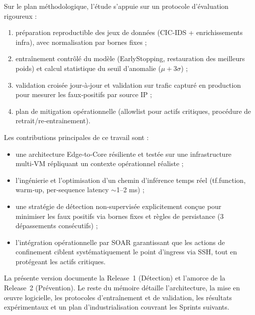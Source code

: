 Sur le plan méthodologique, l'étude s'appuie sur un protocole d'évaluation rigoureux :
\begin{enumerate}
  \item préparation reproductible des jeux de données (CIC‑IDS + enrichissements infra), avec normalisation par bornes fixes ;
  \item entraînement contrôlé du modèle (EarlyStopping, restauration des meilleurs poids) et calcul statistique du seuil d'anomalie ($\mu + 3\sigma$) ;
  \item validation croisée jour‑à‑jour et validation sur trafic capturé en production pour mesurer les faux‑positifs par source IP ;
  \item plan de mitigation opérationnelle (allowlist pour actifs critiques, procédure de retrait/re‑entrainement). 
\end{enumerate}

Les contributions principales de ce travail sont :
\begin{itemize}
  \item une architecture Edge‑to‑Core résiliente et testée sur une infrastructure multi‑VM répliquant un contexte opérationnel réaliste ;
  \item l'ingénierie et l'optimisation d'un chemin d'inférence temps réel (tf.function, warm‑up, per‑sequence latency $\sim$1–2 ms) ;
  \item une stratégie de détection non‑supervisée explicitement conçue pour minimiser les faux positifs via bornes fixes et règles de persistance (3 dépassements consécutifs) ;
  \item l'intégration opérationnelle par SOAR garantissant que les actions de confinement ciblent systématiquement le point d'ingress via SSH, tout en protégeant les actifs critiques.
\end{itemize}

La présente version documente la Release~1 (Détection) et l'amorce de la Release~2 (Prévention). Le reste du mémoire détaille l'architecture, la mise en œuvre logicielle, les protocoles d'entraînement et de validation, les résultats expérimentaux et un plan d'industrialisation couvrant les Sprints suivants.
